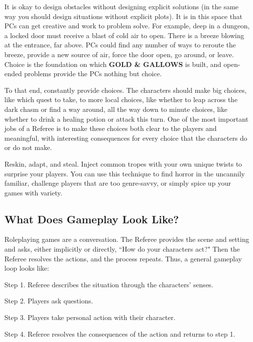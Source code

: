 \documentclass[twoside]{article}
\begin{document}
\bigbreak

It is okay to design obstacles without designing explicit solutions (in the same way you should design situations without explicit plots). It is in this space that PCs can get creative and work to problem solve. For example, deep in a dungeon, a locked door must receive a blast of cold air to open. There is a breeze blowing at the entrance, far above. PCs could find any number of ways to reroute the breeze, provide a new source of air, force the door open, go around, or leave. Choice is the foundation on which \textbf{GOLD \& GALLOWS} is built, and open-ended problems provide the PCs nothing but choice.

\bigbreak

To that end, constantly provide choices. The characters should make big choices, like which quest to take, to more local choices, like whether to leap across the dark chasm or find a way around, all the way down to minute choices, like whether to drink a healing potion or attack this turn. One of the most important jobs of a Referee is to make these choices both clear to the players and meaningful, with interesting consequences for every choice that the characters do or do not make.

\bigbreak

Reskin, adapt, and steal. Inject common tropes with your own unique twists to surprise your players. You can use this technique to find horror in the uncannily familiar, challenge players that are too genre-savvy, or simply spice up your games with variety.

\subsection*{What Does Gameplay Look Like?}

Roleplaying games are a conversation. The Referee provides the scene and setting and asks, either implicitly or directly, ``How do your characters act?" Then the Referee resolves the actions, and the process repeats. Thus, a general gameplay loop looks like:

\bigbreak

Step 1. Referee describes the situation through the characters' senses.

Step 2. Players ask questions.

Step 3. Players take personal action with their character.

Step 4. Referee resolves the consequences of the action and returns to step 1.
\end{document}
